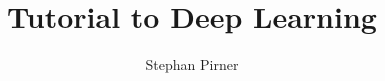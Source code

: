 \documentclass[a4paper,10pt]{article}
\title{Tutorial to Deep Learning}
\author{Stephan Pirner}
\begin{document}
\maketitle

\begin{abstract}

\end{abstract}

\section{}
\end{document}
